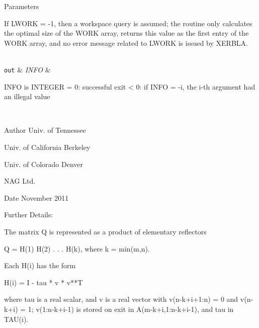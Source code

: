\begin{DoxyParams}[1]{Parameters}
\begin{DoxyVerb}
          If LWORK = -1, then a workspace query is assumed; the routine
          only calculates the optimal size of the WORK array, returns
          this value as the first entry of the WORK array, and no error
          message related to LWORK is issued by XERBLA.\end{DoxyVerb}
\\
\hline
\mbox{\tt out}  & {\em I\+N\+F\+O} & \begin{DoxyVerb}          INFO is INTEGER
          = 0:  successful exit
          < 0:  if INFO = -i, the i-th argument had an illegal value\end{DoxyVerb}
 \\
\hline
\end{DoxyParams}
\begin{DoxyAuthor}{Author}
Univ. of Tennessee 

Univ. of California Berkeley 

Univ. of Colorado Denver 

N\+A\+G Ltd. 
\end{DoxyAuthor}
\begin{DoxyDate}{Date}
November 2011 
\end{DoxyDate}
\begin{DoxyParagraph}{Further Details\+: }
\begin{DoxyVerb}  The matrix Q is represented as a product of elementary reflectors

     Q = H(1) H(2) . . . H(k), where k = min(m,n).

  Each H(i) has the form

     H(i) = I - tau * v * v**T

  where tau is a real scalar, and v is a real vector with
  v(n-k+i+1:n) = 0 and v(n-k+i) = 1; v(1:n-k+i-1) is stored on exit in
  A(m-k+i,1:n-k+i-1), and tau in TAU(i).\end{DoxyVerb}
 
\end{DoxyParagraph}
\hypertarget{group__doubleGEcomputational_gac14340a964d1df1b2f4483844a7c0df1}{}
